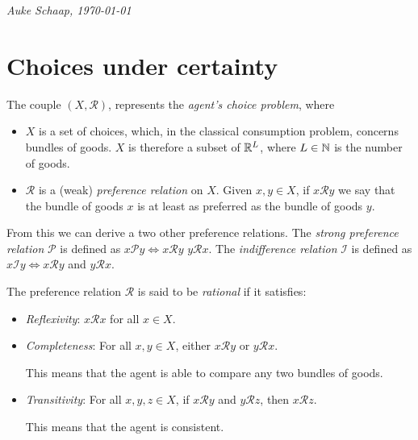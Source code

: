 \documentclass[twoside, titlepage]{article}
\begin{document}
\bigskip
\begin{flushright}
    \textit{Auke Schaap, \today}
\end{flushright}

\vspace*{\fill}
\newpage

\thispagestyle{empty}
\tableofcontents
\clearpage

\section{Choices under certainty}

The couple $(X, \mathcal{R})$, represents the \textit{agent's choice problem}, where
\begin{itemize}
    \item $X$ is a set of choices, which, in the classical consumption problem, concerns bundles of goods. $X$ is therefore a subset of $\mathbb{R}^L$, where $L \in \mathbb{N}$ is the number of goods.
    \item $\mathcal{R}$ is a (weak) \textit{preference relation} on $X$. Given $x,y \in X$, if $x \mathcal{R} y$ we say that the bundle of goods $x$ is at least as preferred as the bundle of goods $y$.
\end{itemize}

From this we can derive a two other preference relations. The \textit{strong preference relation} $\mathcal{P}$ is defined as $x \mathcal{P} y \iff x \mathcal{R} y$  $y \mathcal{R} x$. The \textit{indifference relation} $\mathcal{I}$ is defined as $x \mathcal{I} y \iff x \mathcal{R} y $ and $y \mathcal{R} x$.

\begin{assumption}[Rationality] \label{ass:rationality}
    The preference relation $\mathcal{R}$ is said to be \textit{rational} if it satisfies:
    \begin{itemize}
        \item \textit{Reflexivity}: $x \mathcal{R} x$ for all $x \in X$.
        \item \textit{Completeness}: For all $x, y \in X$, either $x \mathcal{R} y$ or $y \mathcal{R} x$.
        \begin{explanation}
            This means that the agent is able to compare any two bundles of goods.
        \end{explanation}
        \item \textit{Transitivity}: For all $x, y, z \in X$, if $x \mathcal{R} y$ and $y \mathcal{R} z$, then $x \mathcal{R} z$.
        \begin{explanation}
            This means that the agent is consistent.
        \end{explanation}
    \end{itemize}
\end{assumption}
\end{document}

